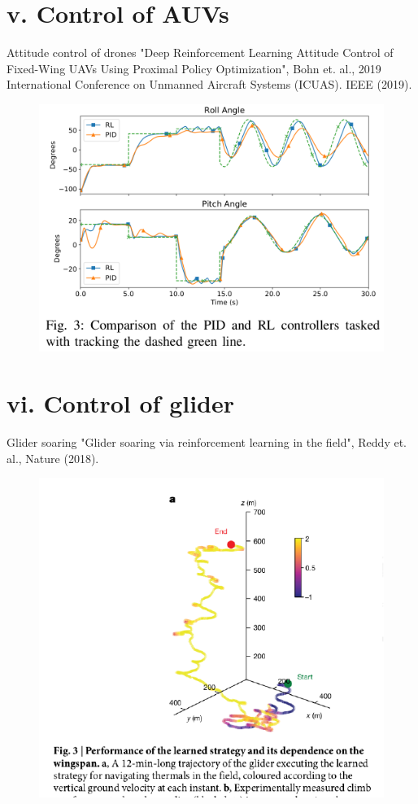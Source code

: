 \documentclass{beamer}
\begin{document}
\section{v. Control of AUVs}


\begin{frame}{Attitude control of drones}
"Deep Reinforcement Learning Attitude Control of Fixed-Wing UAVs Using Proximal Policy Optimization", Bohn et. al., 2019 International Conference on Unmanned Aircraft Systems (ICUAS). IEEE (2019). 

\begin{figure}
    \begin{center}
      \includegraphics[width=.75\textwidth]{Figures/PID_vs_PPO_attitude_control}
    \end{center}
    \end{figure}
\end{frame}



\section{vi. Control of glider}


\begin{frame}{Glider soaring}
"Glider soaring via reinforcement learning in the field", Reddy et. al., Nature (2018).

\begin{figure}
    \begin{center}
      \includegraphics[width=.55\textwidth]{Figures/soaring_glider}
    \end{center}
    \end{figure}
\end{frame}
\end{document}
